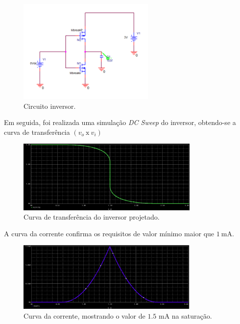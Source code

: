 \documentclass[11pt]{article}
\begin{document}
\begin{enumerate}[label=\alph*)]
\begin{figure}
    \centering
    \includegraphics[width=0.6\textwidth]{imgs/circuito_inversor.png}
    \caption{Circuito inversor.}
    \label{fig:circuito_inversor}
\end{figure}

Em seguida, foi realizada uma simulação \textit{DC Sweep} do inversor, obtendo-se a curva de transferência $(v_o\ \text{x}\ v_i)$

\begin{figure}
    \centering
    \includegraphics[width=0.8\textwidth]{imgs/curva_inversor.png}
    \caption{Curva de transferência do inversor projetado.}
    \label{fig:curva_inversor}
\end{figure}

A curva da corrente confirma os requisitos de valor mínimo maior que $1\ \text{mA}$.

\begin{figure}
    \centering
    \includegraphics[width=0.8\textwidth]{imgs/i_sat.png}
    \caption{Curva da corrente, mostrando o valor de $1.5$ mA na saturação.}
    \label{fig:i_sat}
\end{figure}


\end{enumerate}
\end{document}
